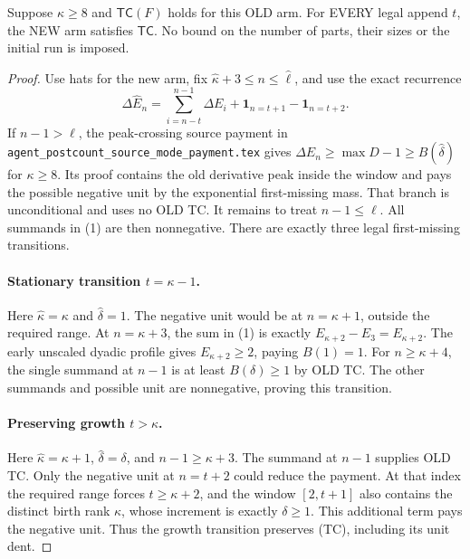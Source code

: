 \begin{theorem}
Suppose $\kappa\ge8$ and $\mathsf{TC}(F)$ holds for this OLD arm.
For EVERY legal append $t$, the NEW arm satisfies $\mathsf{TC}$.
No bound on the number of parts, their sizes or the initial run is imposed.
\end{theorem}
\begin{proof}
Use hats for the new arm, fix $\widehat\kappa+3\le n\le\widehat\ell$,
and use the exact recurrence
\[
 \Delta\widehat E_n
   =\sum_{i=n-t}^{n-1}\Delta E_i
          +\mathbf1_{n=t+1}-\mathbf1_{n=t+2}.           \tag{1}
\]
If $n-1>\ell$, the peak-crossing source payment in
\texttt{agent\_postcount\_source\_mode\_payment.tex} gives
$\Delta\widehat E_n\ge\max D-1\ge B(\widehat\delta)$ for
$\kappa\ge8$. Its proof contains the old derivative peak inside
the window and pays the possible negative unit by the exponential
first-missing mass. That branch is unconditional and uses no OLD TC.
It remains to treat $n-1\le\ell$. All summands in (1) are then
nonnegative. There are exactly three legal first-missing transitions.

\paragraph{Stationary transition $t=\kappa-1$.}
Here $\widehat\kappa=\kappa$ and $\widehat\delta=1$.
The negative unit would be at $n=\kappa+1$, outside the required range.
At $n=\kappa+3$, the sum in (1) is exactly
$E_{\kappa+2}-E_3=E_{\kappa+2}$. The early unscaled dyadic profile
gives $E_{\kappa+2}\ge2$, paying $B(1)=1$.
For $n\ge\kappa+4$, the single summand at $n-1$ is at least
$B(\delta)\ge1$ by OLD TC. The other summands and possible unit
are nonnegative, proving this transition.

\paragraph{Preserving growth $t>\kappa$.}
Here $\widehat\kappa=\kappa+1$, $\widehat\delta=\delta$,
and $n-1\ge\kappa+3$. The summand at $n-1$ supplies OLD TC.
Only the negative unit at $n=t+2$ could reduce the payment.
At that index the required range forces $t\ge\kappa+2$,
and the window $[2,t+1]$ also contains the distinct birth rank
$\kappa$, whose increment is exactly $\delta\ge1$.
This additional term pays the negative unit. Thus the growth
transition preserves (TC), including its unit dent.


\end{proof}
